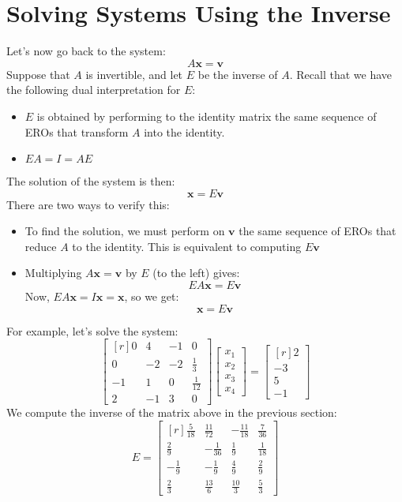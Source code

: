 \documentclass[12pt]{article}
\begin{document}
\section{Solving Systems Using the Inverse}
Let's now go back to the system:
\[
A\mathbf{x}=\mathbf{v}
\]
Suppose that $A$ is invertible, and let $E$ be the inverse of $A$. Recall that we have the following dual interpretation for $E$:
\begin{itemize}
\item $E$ is obtained by performing to the identity matrix the same sequence of EROs that transform $A$ into the identity.
\item $EA=I=AE$
\end{itemize}
The solution of the system is then:
\[
\mathbf{x}=E\mathbf{v}
\]
There are two ways to verify this:
\begin{itemize}
\item To find the solution, we must perform on $\mathbf{v}$ the same sequence of EROs that reduce $A$ to the identity. This is equivalent to computing $E\mathbf{v}$
\item Multiplying $A\mathbf{x}=\mathbf{v}$ by $E$ (to the left) gives:
\[
EA\mathbf{x}=E\mathbf{v}
\]
Now, $EA\mathbf{x}=I\mathbf{x}=\mathbf{x}$, so we get:
\[
\mathbf{x}=E\mathbf{v}
\]
\end{itemize}
For example, let's solve the system:
\[
\left[\begin{matrix*}[r]0 & 4 & -1 & 0\\0 & -2 & -2 & \frac{1}{3}\\-1 & 1 & 0 & \frac{1}{12}\\2 & -1 & 3 & 0\end{matrix*}\right]
\begin{bmatrix}x_1\\x_2\\x_3\\x_4\end{bmatrix}=
\left[\begin{matrix*}[r]2\\-3\\5\\-1\end{matrix*}\right]
\]
We compute the inverse of the matrix above in the previous section:
\[
E=
\left[\begin{matrix*}[r]\frac{5}{18} & \frac{11}{72} & - \frac{11}{18} & \frac{7}{36}\\\frac{2}{9} & - \frac{1}{36} & \frac{1}{9} & \frac{1}{18}\\- \frac{1}{9} & - \frac{1}{9} & \frac{4}{9} & \frac{2}{9}\\\frac{2}{3} & \frac{13}{6} & \frac{10}{3} & \frac{5}{3}\end{matrix*}\right]
\]
\end{document}
